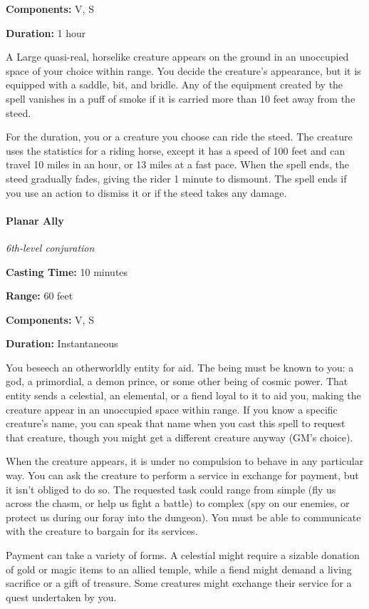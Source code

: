 \documentclass[
]{article}
\begin{document}
\textbf{Components:} V, S

\textbf{Duration:} 1 hour

A Large quasi-real, horselike creature appears on the ground in an
unoccupied space of your choice within range. You decide the creature's
appearance, but it is equipped with a saddle, bit, and bridle. Any of
the equipment created by the spell vanishes in a puff of smoke if it is
carried more than 10 feet away from the steed.

For the duration, you or a creature you choose can ride the steed. The
creature uses the statistics for a riding horse, except it has a speed
of 100 feet and can travel 10 miles in an hour, or 13 miles at a fast
pace. When the spell ends, the steed gradually fades, giving the rider 1
minute to dismount. The spell ends if you use an action to dismiss it or
if the steed takes any damage.

\hypertarget{planar-ally}{%
\paragraph{Planar Ally}\label{planar-ally}}

\emph{6th-level conjuration}

\textbf{Casting Time:} 10 minutes

\textbf{Range:} 60 feet

\textbf{Components:} V, S

\textbf{Duration:} Instantaneous

You beseech an otherworldly entity for aid. The being must be known to
you: a god, a primordial, a demon prince, or some other being of cosmic
power. That entity sends a celestial, an elemental, or a fiend loyal to
it to aid you, making the creature appear in an unoccupied space within
range. If you know a specific creature's name, you can speak that name
when you cast this spell to request that creature, though you might get
a different creature anyway (GM's choice).

When the creature appears, it is under no compulsion to behave in any
particular way. You can ask the creature to perform a service in
exchange for payment, but it isn't obliged to do so. The requested task
could range from simple (fly us across the chasm, or help us fight a
battle) to complex (spy on our enemies, or protect us during our foray
into the dungeon). You must be able to communicate with the creature to
bargain for its services.

Payment can take a variety of forms. A celestial might require a sizable
donation of gold or magic items to an allied temple, while a fiend might
demand a living sacrifice or a gift of treasure. Some creatures might
exchange their service for a quest undertaken by you.
\end{document}
